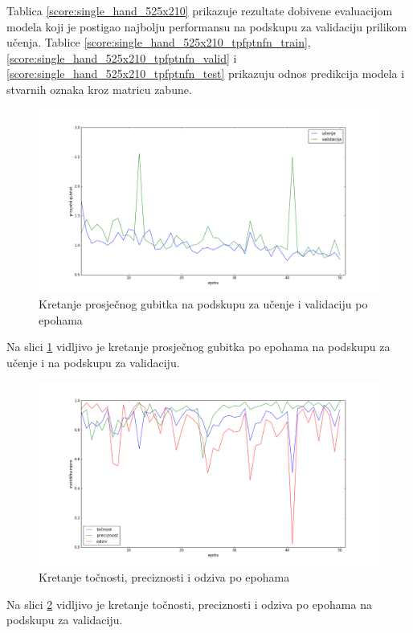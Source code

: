 \documentclass[times, utf8, diplomski, numeric]{fer}
\begin{document}
\noindent Tablica \ref{score:single_hand_525x210} prikazuje rezultate dobivene evaluacijom modela koji je postigao najbolju performansu na podskupu za validaciju prilikom učenja.
Tablice \ref{score:single_hand_525x210_tpfptnfn_train}, \ref{score:single_hand_525x210_tpfptnfn_valid} i \ref{score:single_hand_525x210_tpfptnfn_test} prikazuju odnos predikcija modela i stvarnih oznaka kroz matricu zabune.

\begin{figure}[H]
\centering
\includegraphics[scale=0.35]{images/single_hand_scale075_loss.png}
\caption{Kretanje prosječnog gubitka na podskupu za učenje i validaciju po epohama}
\label{img:single_hand_scale075_loss}
\end{figure}
\noindent Na slici \ref{img:single_hand_scale075_loss} vidljivo je kretanje prosječnog gubitka po epohama na podskupu za učenje i na podskupu za validaciju.

\begin{figure}[H]
\centering
\includegraphics[scale=0.35]{images/single_hand_scale075_acc_ap.png}
\caption{Kretanje točnosti, preciznosti i odziva po epohama}
\label{img:single_hand_scale075_acc_ap}
\end{figure}
\noindent Na slici \ref{img:single_hand_scale075_acc_ap} vidljivo je kretanje točnosti, preciznosti i odziva po epohama na podskupu za validaciju.
\end{document}
